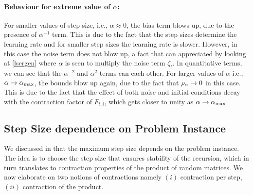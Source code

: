 \paragraph{Behaviour for extreme value of $\alpha$:} For smaller values of step size, i.e., $\alpha\approx 0$, the bias term blows up, due to the presence of $\alpha^{-1}$ term. This is due to the fact that the step sizes determine the learning rate and for smaller step sizes the learning rate is slower. However, in this case the noise term does not blow up, a fact that can appreciated by looking at \eqref{lsergen} where $\alpha$ is seen to multiply the noise term $\zeta_t$. In quantitative terms, we can see that the $\alpha^{-2}$ and $\alpha^2$ terms can each other. For larger values of $\alpha$ i.e., $\alpha\rightarrow \alpha_{\max}$, the bounds blow up again, due to the fact that $\rho_{\alpha}\rightarrow 0$ in this case. This is due to the fact that the effect of both noise and initial conditions decay with the contraction factor of $F_{t,i}$, which gets closer to unity as $\alpha\rightarrow\alpha_{\max}$.


\subsection{Step Size dependence on Problem Instance}
\label{sec:stepprob}
We discussed in  that the maximum step size depends on the problem instance. The idea is to choose the step size that ensures stability of the recursion, which in turn translates to contraction properties of the product of random matrices. We now elaborate on two notions of contractions namely $(i)$ contraction per step, $(ii)$ contraction of the product.
